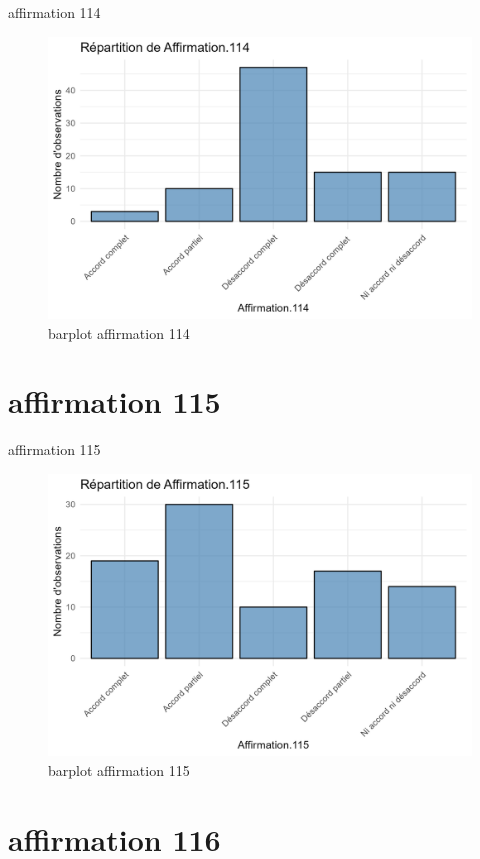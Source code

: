 \documentclass[
]{article}
\begin{document}
affirmation 114

\begin{figure}
\centering
\includegraphics{Image/barplot_Affirmation.114.png}
\caption{barplot affirmation 114}
\end{figure}

\section{affirmation 115}\label{affirmation-115}

affirmation 115

\begin{figure}
\centering
\includegraphics{Image/barplot_Affirmation.115.png}
\caption{barplot affirmation 115}
\end{figure}

\section{affirmation 116}\label{affirmation-116}
\end{document}
